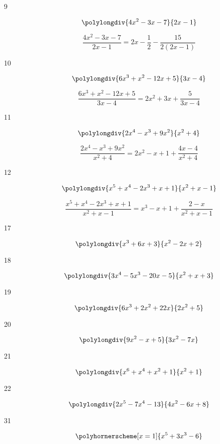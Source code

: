 \documentclass{exam}
\begin{document}
\begin{description}
      \pagebreak

      \item[9] 
        \[
          \polylongdiv{4x^2 - 3x - 7}{2x - 1}
        \]

        \[
          \frac{4x^2 - 3x - 7}{2x - 1} = \boxed{2x - \frac{1}{2} - \frac{15}{2(2x - 1)}}
        \]

      \item[10] 
        \[
          \polylongdiv{6x^3 + x^2 - 12x + 5}{3x - 4}
        \]

        \[
          \frac{6x^3 + x^2 - 12x + 5}{3x - 4} = \boxed{2x^2 + 3x + \frac{5}{3x - 4}}
        \]

      \item[11] 
        \[
          \polylongdiv{2x^4 - x^3 + 9x^2}{x^2 + 4}
        \]

        \[
          \frac{2x^4 - x^3 + 9x^2}{x^2 + 4} = \boxed{2x^2 - x + 1 + \frac{4x - 4}{x^2 + 4}}
        \]

      \item[12] 
        \[
          \polylongdiv{x^5 + x^4 - 2x^3 + x + 1}{x^2 + x - 1}
        \]

        \[
          \frac{x^5 + x^4 - 2x^3 + x + 1}{x^2 + x - 1} = \boxed{x^3 - x + 1 + \frac{2- x}{x^2 + x - 1}}
        \]

      \item[17] 
        \[
          \polylongdiv{x^3 + 6x + 3}{x^2 - 2x + 2}
        \]

      \item[18] 
        \[
          \polylongdiv{3x^4 - 5x^3 - 20x - 5}{x^2 + x + 3}
        \]

      \item[19] 
        \[
          \polylongdiv{6x^3 + 2x^2 + 22x}{2x^2 + 5}
        \]

      \item[20] 
        \[
          \polylongdiv{9x^2 - x + 5}{3x^2 - 7x}
        \]

      \item[21] 
        \[
          \polylongdiv{x^6 + x^4 + x^2 + 1}{x^2 + 1}
        \]

      \item[22] 
        \[
          \polylongdiv{2x^5 - 7x^4 - 13}{4x^2 - 6x + 8}
        \]

      \item[31] 
        \[
          \polyhornerscheme[x = 1]{x^5 + 3x^3 - 6}
        \]



\end{description}
\end{document}
